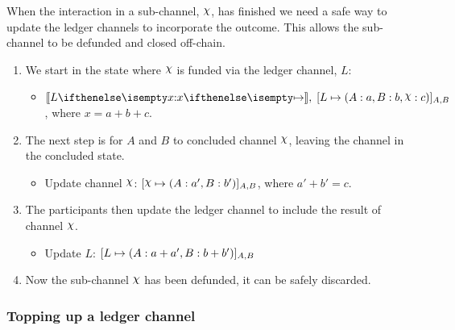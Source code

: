 \documentclass{article}
\begin{document}
When the interaction in a sub-channel, $\rchi$, has finished we need a safe way to update the ledger channels to incorporate the outcome.
This allows the sub-channel to be defunded and closed off-chain.
\begin{enumerate}
  \item We start in the state where $\rchi$ is funded via the ledger channel, $L$:
  \begin{itemize}
    \item $\adj{\holds{L}{x}{}}, \; \finalizable{L}{\alloc{A: a, B: b, \rchi: c}}{A, B}$, where $x = a + b + c$.
  \end{itemize}
  \item The next step is for $A$ and $B$ to concluded channel $\rchi$, leaving the channel in the concluded state.
  \begin{itemize}
    \item Update channel $\rchi$: $\finalizable{\rchi}{\alloc{A:a', B:b'}}{A,B}$, where $a' + b' = c$.
  \end{itemize}
  \item The participants then update the ledger channel to include the result of channel $\rchi$.
  \begin{itemize}
    \item Update $L$: $[L \mapsto ( A: a+ a', B: b + b' )]_{A, B}$
  \end{itemize}
  \item Now the sub-channel $\rchi$ has been defunded, it can be safely discarded.
\end{enumerate}

\subsubsection{Topping up a ledger channel}
\end{document}

